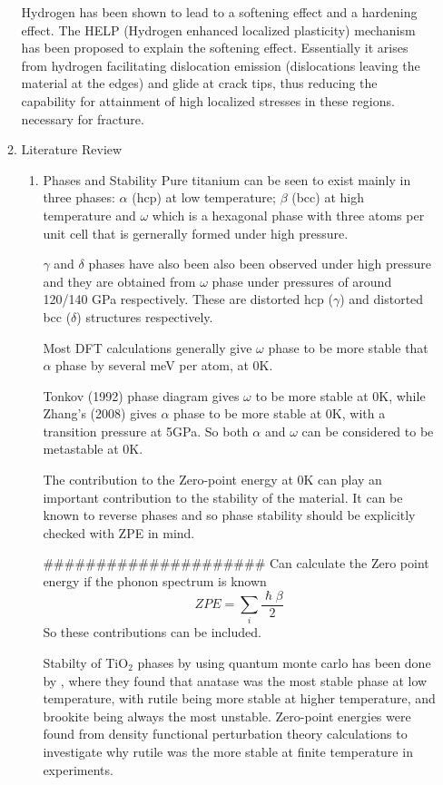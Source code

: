 \documentclass[11pt]{article}
\begin{document}
\begin{enumerate}
\begin{enumerate}
Hydrogen has been shown to lead to a softening effect and a hardening effect. The HELP 
(Hydrogen enhanced localized plasticity) mechanism has been proposed to explain the softening effect. 
Essentially it arises from hydrogen facilitating dislocation emission (dislocations leaving the material
at the edges) and glide at crack tips, thus reducing the capability for attainment of high localized
stresses in these regions. necessary for fracture. 






\item Literature Review
\label{sec:org2edc184}

\begin{enumerate}
\item Phases and Stability
\label{sec:org1d05150}
Pure titanium can be seen to exist mainly in three phases: \(\alpha\) (hcp) at low temperature; 
\(\beta\) (bcc) at high temperature and \(\omega\) which is a hexagonal phase with three atoms per 
unit cell that is gernerally formed under high pressure.

\(\gamma\) and \(\delta\) phases have also been also been observed under high pressure and they are
obtained from \(\omega\) phase under pressures of around 120/140 GPa respectively. These are distorted 
hcp (\(\gamma\)) and distorted bcc (\(\delta\)) structures respectively. 

Most DFT calculations generally give \(\omega\) phase to be more stable that \(\alpha\) phase by several 
meV per atom, at 0K.

Tonkov (1992) phase diagram gives \(\omega\) to be more stable at 0K, while Zhang's (2008) gives \(\alpha\) phase
to be more stable at 0K, with a transition pressure at 5GPa. So both \(\alpha\) and \(\omega\) can be considered 
to be metastable at 0K. 

The contribution to the Zero-point energy at 0K can play an important contribution to the stability of 
the material. It can be known to reverse phases and so phase stability should be explicitly checked
with ZPE in mind. 

\#\#\#\#\#\#\#\#\#\#\#\#\#\#\#\#\#\#\#\#\#
Can calculate the Zero point energy if the phonon spectrum is known 
\[
ZPE = \sum_i \frac{\hslash\beta}{2}
\]
So these contributions can be included. 

Stabilty of TiO\(_2\) phases by using quantum monte carlo has been done by \cite{Luo2016}, 
where they found that anatase was the most stable phase at low temperature, with rutile being more stable 
at higher temperature, and brookite being always the most unstable. Zero-point energies were found from 
density functional perturbation theory calculations to investigate why rutile was the more stable at finite temperature
in experiments. 


\end{enumerate}
\end{enumerate}
\end{enumerate}
\end{document}
